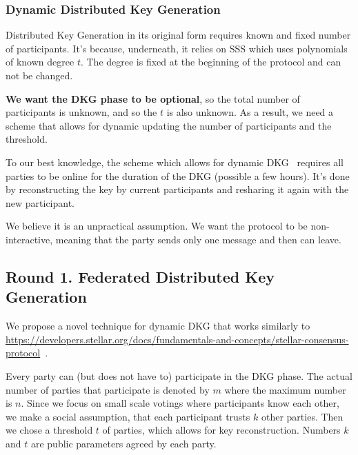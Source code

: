 \documentclass[runningheads]{llncs}
\begin{document}
\subsubsection*{Dynamic Distributed Key Generation}
Distributed Key Generation in its original form requires known and fixed number of participants. It's because, underneath, it relies on SSS which uses polynomials of known degree $t$. The degree is fixed at the beginning of the protocol and can not be changed.

\textbf{We want the DKG phase to be optional}, so the total number of participants is unknown, and so the $t$ is also unknown. As a result, we need a scheme that allows for dynamic updating the number of participants and the threshold.

To our best knowledge, the scheme which allows for dynamic DKG~\cite{delerableeDynamicThresholdPublickey2008} requires all parties to be online for the duration of the DKG (possible a few hours). It's done by reconstructing the key by current participants and resharing it again with the new participant.

We believe it is an unpractical assumption. We want the protocol to be non-interactive, meaning that the party sends only one message and then can leave.



\subsection{Round 1. Federated Distributed Key Generation}

We propose a novel technique for dynamic DKG that works similarly to \href{Stellar Consensus Protocol}{https://developers.stellar.org/docs/fundamentals-and-concepts/stellar-consensus-protocol}~\cite{mazieresStellarConsensusProtocol2015}.

Every party can (but does not have to) participate in the DKG phase. The actual number of parties that participate is denoted by $m$ where the maximum number is $n$. Since we focus on small scale votings where participants know each other, we make a social assumption, that each participant trusts $k$ other parties. Then we chose a threshold $t$ of parties, which allows for key reconstruction. Numbers $k$ and $t$ are public parameters agreed by each party.
\end{document}
